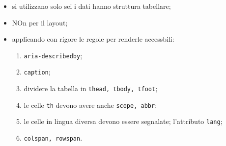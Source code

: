 \documentclass[12pt]{article}
\begin{document}
\begin{itemize}
	\item si utilizzano solo sei i dati hanno struttura tabellare;
	\item NOn per il layout;
	\item applicando con rigore le regole per renderle accessbili:
	      \begin{enumerate}
		      \item \lstinline{aria-describedby};
		      \item \lstinline{caption};
		      \item dividere la tabella in \lstinline{thead, tbody, tfoot};
		      \item le celle \lstinline{th} devono avere anche
		            \lstinline{scope, abbr};
		      \item le celle in lingua diversa devono essere segnalate;
		            l'attributo \lstinline{lang};
		      \item \lstinline{colspan, rowspan}.
	      \end{enumerate}
\end{itemize}
\end{document}
